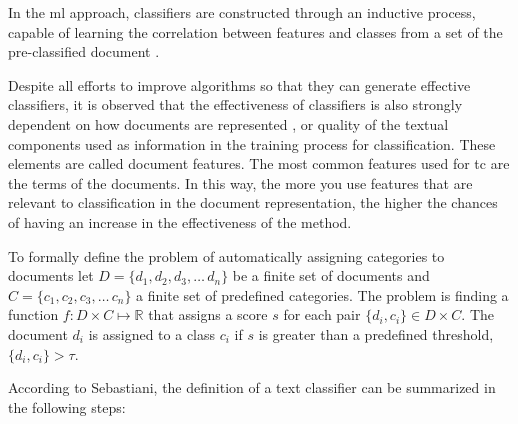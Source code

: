 In the \gls{ml} approach, classifiers are constructed through an inductive process, capable of learning the correlation between features and classes from a set of the pre-classified document \cite{Sebastiani:2002}.

Despite all efforts to improve algorithms so that they can generate effective classifiers, it is observed that the effectiveness of classifiers is also strongly dependent on how documents are represented \cite{Gabrilovich:2006, bekkerman2004using, supreethi2010novel}, or quality of the textual components used as information in the training process for classification. These elements are called document features. The most common features used for \gls{tc} are the terms of the documents. In this way, the more you use features that are relevant to classification in the document representation, the higher the chances of having an increase in the effectiveness of the method.


To formally define the problem of automatically assigning categories to documents let $D = \{d_1,d_2,d_3,\ldots\,d_n\}$ be a finite set of documents and $C = \{c_1,c_2,c_3,\ldots\,c_n\}$ a finite set of predefined categories.
The problem is finding a function $f: D \times C \mapsto \mathbb{R}$ that assigns a score $s$ for each pair 
$\{d_i, c_i\} \in  D \times C $. The document $d_i$ is assigned to a class $c_i$ if $s$ is greater than a predefined threshold, $\{d_i, c_i\} > \tau$.

According to Sebastiani\cite{Sebastiani:2002}, the definition of a text classifier can be summarized in the following steps:

